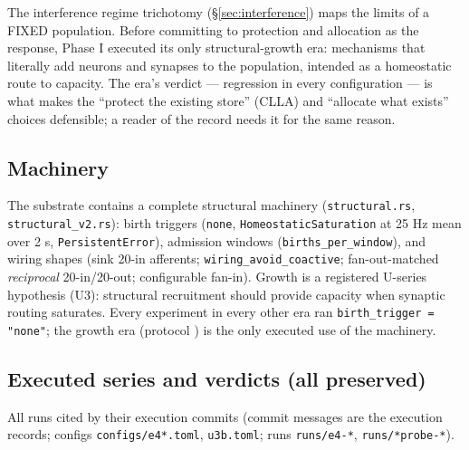 The interference regime trichotomy (\S\ref{sec:interference}) maps the
limits of a FIXED population. Before committing to protection and
allocation as the response, Phase I executed its only structural-growth
era: mechanisms that literally add neurons and synapses to the
population, intended as a homeostatic route to capacity. The era's
verdict --- regression in every configuration --- is what makes the
``protect the existing store'' (CLLA) and ``allocate what exists''
choices defensible; a reader of the record needs it for the same
reason.

\subsection{Machinery}

The substrate contains a complete structural machinery
(\texttt{structural.rs}, \texttt{structural\_v2.rs}): birth triggers
(\texttt{none}, \texttt{Homeostatic\-Saturation} at 25 Hz mean over
2 s, \texttt{PersistentError}), admission windows
(\texttt{births\_per\-\allowbreak \_window}), and wiring shapes (sink
20-in afferents; \texttt{wiring\_avoid\_coactive}; fan-out-matched
\emph{reciprocal} 20-in/20-out; configurable fan-in). Growth is a
registered U-series hypothesis (U3): structural recruitment should
provide capacity when synaptic routing saturates. Every experiment in
every other era ran \texttt{birth\_trigger = "none"}; the growth era
(protocol \cite{e4proto}) is the only executed use of the machinery.

\subsection{Executed series and verdicts (all preserved)}

All runs cited by their execution commits (commit messages are the
execution records; configs \texttt{configs/e4*.toml}, \texttt{u3b.toml};
runs \texttt{runs/e4-*}, \texttt{runs/*probe-*}).

